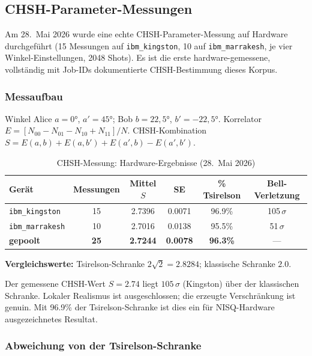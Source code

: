 \subsection{CHSH-Parameter-Messungen}

Am 28.~Mai 2026 wurde eine echte CHSH-Parameter-Messung auf Hardware durchgeführt (15 Messungen auf \texttt{ibm\_kingston}, 10 auf \texttt{ibm\_marrakesh}, je vier Winkel-Einstellungen, 2048 Shots). Es ist die erste hardware-gemessene, vollständig mit Job-IDs dokumentierte CHSH-Bestimmung dieses Korpus.

\subsubsection{Messaufbau}

Winkel Alice $a=0°$, $a'=45°$; Bob $b=22{,}5°$, $b'=-22{,}5°$. Korrelator $E = [N_{00}-N_{01}-N_{10}+N_{11}]/N$. CHSH-Kombination $S = E(a,b)+E(a,b')+E(a',b)-E(a',b')$.

\begin{table}[h]
	\centering
	\caption{CHSH-Messung: Hardware-Ergebnisse (28.~Mai 2026)}
	\label{tab:chsh_real}
	\begin{tabular}{@{}lccccc@{}}
		\toprule
		Gerät & Messungen & Mittel $S$ & SE & \% Tsirelson & Bell-Verletzung \\
		\midrule
		\texttt{ibm\_kingston} & 15 & 2.7396 & 0.0071 & 96.9\% & 105\,$\sigma$ \\
		\texttt{ibm\_marrakesh} & 10 & 2.7016 & 0.0138 & 95.5\% & 51\,$\sigma$ \\
		\textbf{gepoolt} & \textbf{25} & \textbf{2.7244} & \textbf{0.0078} & \textbf{96.3\%} & --- \\
		\bottomrule
	\end{tabular}
\end{table}

\textbf{Vergleichswerte:} Tsirelson-Schranke $2\sqrt{2} = 2.8284$; klassische Schranke $2.0$.

\begin{keyresult}
	Der gemessene CHSH-Wert $S = 2.74$ liegt $105\,\sigma$ (Kingston) über der klassischen Schranke. Lokaler Realismus ist ausgeschlossen; die erzeugte Verschränkung ist genuin. Mit 96.9\% der Tsirelson-Schranke ist dies ein für NISQ-Hardware ausgezeichnetes Resultat.
\end{keyresult}

\subsubsection{Abweichung von der Tsirelson-Schranke}

